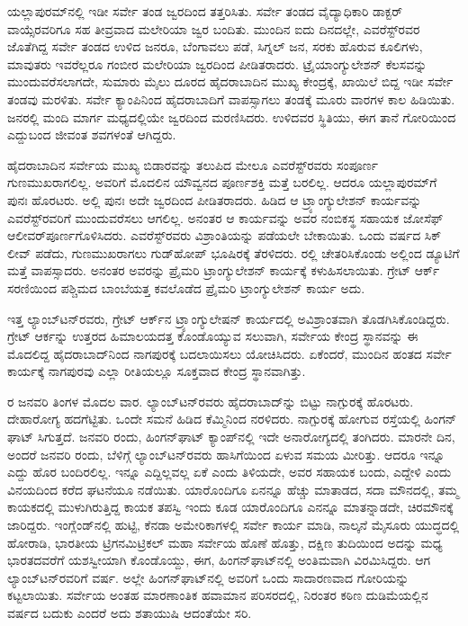 ಯಲ್ಲಾಪುರಮ್‌ನಲ್ಲಿ ಇಡೀ ಸರ್ವೇ ತಂಡ ಜ್ವರದಿಂದ ತತ್ತರಿಸಿತು. ಸರ್ವೇ ತಂಡದ ವೈದ್ಯಾಧಿಕಾರಿ ಡಾಕ್ಟರ್​ ವಾಯ್ಸೆರವರಿಗೂ ಸಹ ತೀವ್ರವಾದ ಮಲೇರಿಯಾ ಜ್ವರ ಬಂದಿತು. ಮುಂದಿನ ಐದು ದಿನದಲ್ಲೇ, ಎವರೆಸ್ಟ್​ರವರ ಜೊತೆಗಿದ್ದ ಸರ್ವೇ ತಂಡದ ಉಳಿದ  ಜನರೂ, ಬೆಂಗಾವಲು ಪಡೆ, ಸಿಗ್ನಲ್​ ಜನ, ಸರಕು ಹೊರುವ ಕೂಲಿಗಳು, ಮಾವುತರು ಇವರೆಲ್ಲರೂ ಗಂಬೀರ ಮಲೇರಿಯಾ ಜ್ವರದಿಂದ ಪೀಡಿತರಾದರು. ಟ್ರೈಯಾಂಗ್ಯುಲೇಶನ್​ ಕೆಲಸವನ್ನು ಮುಂದುವರೆಸಲಾಗದೇ, ಸುಮಾರು  ಮೈಲು ದೂರದ ಹೈದರಾಬಾದಿನ ಮುಖ್ಯ ಕೇಂದ್ರಕ್ಕೆ, ಖಾಯಿಲೆ ಬಿದ್ದ ಇಡೀ ಸರ್ವೇ ತಂಡವು ಮರಳಿತು. ಸರ್ವೇ ಕ್ಯಾಂಪಿನಿಂದ ಹೈದರಾಬಾದಿಗೆ ವಾಪಸ್ಸಾಗಲು ತಂಡಕ್ಕೆ ಮೂರು ವಾರಗಳ ಕಾಲ ಹಿಡಿಯಿತು.  ಜನರಲ್ಲಿ  ಮಂದಿ ಮಾರ್ಗ ಮಧ್ಯದಲ್ಲಿಯೇ ಜ್ವರದಿಂದ ಮರಣಿಸಿದರು. ಉಳಿದವರ ಸ್ಥಿತಿಯು, ಈಗ ತಾನೆ ಗೋರಿಯಿಂದ ಎದ್ದುಬಂದ ಜೀವಂತ ಶವಗಳಂತೆ ಆಗಿದ್ದರು.

ಹೈದರಾಬಾದಿನ ಸರ್ವೇಯ ಮುಖ್ಯ ಬಿಡಾರವನ್ನು ತಲುಪಿದ ಮೇಲೂ ಎವರೆಸ್ಟ್​ರವರು ಸಂಪೂರ್ಣ ಗುಣಮುಖರಾಗಲಿಲ್ಲ. ಅವರಿಗೆ ಮೊದಲಿನ ಯೌವ್ವನದ ಪೂರ್ಣಶಕ್ತಿ ಮತ್ತೆ ಬರಲಿಲ್ಲ. ಆದರೂ ಯಲ್ಲಾಪುರಮ್‌ಗೆ ಪುನಃ ಹೊರಟರು. ಅಲ್ಲಿ ಪುನಃ ಅದೇ ಜ್ವರದಿಂದ ಪೀಡಿತರಾದರು. ಹಿಡಿದ ಆ ಟ್ರ್ಯಾಂಗ್ಯುಲೇಶನ್​ ಕಾರ್ಯವನ್ನು ಎವರೆಸ್ಟ್​ರವರಿಗೆ ಮುಂದುವರೆಸಲು ಆಗಲಿಲ್ಲ. ಅನಂತರ ಆ ಕಾರ್ಯವನ್ನು ಅವರ ನಂಬಿಕಸ್ಥ ಸಹಾಯಕ ಜೋಸೆಫ್​ ಆಲೀವರ್​ ಪೂರ್ಣಗೊಳಿಸಿದರು. ಎವರೆಸ್ಟ್​ರವರು ವಿಶ್ರಾಂತಿಯನ್ನು ಪಡೆಯಲೇ ಬೇಕಾಯಿತು. ಒಂದು ವರ್ಷದ ಸಿಕ್​ ಲೀವ್​ ಪಡೆದು, ಗುಣಮುಖರಾಗಲು ಗುಡ್​ಹೋಪ್​ ಭೂಷಿರಕ್ಕೆ ತೆರಳಿದರು. ರಲ್ಲಿ ಚೇತರಿಸಿಕೊಂಡು ಅಲ್ಲಿಂದ ಡ್ಯೂಟಿಗೆ ಮತ್ತೆ ವಾಪಸ್ಸಾದರು. ಅನಂತರ ಅವರನ್ನು ಪ್ರೈಮರಿ ಟ್ರಾಂಗ್ಯುಲೇಶನ್​ ಕಾರ್ಯಕ್ಕೆ ಕಳುಹಿಸಲಾಯಿತು. ಗ್ರೇಟ್​ ಆರ್ಕ್ ಸರಣಿಯಿಂದ ಪಶ್ಚಿಮದ ಬಾಂಬೆಯತ್ತ ಕವಲೊಡೆದ ಪ್ರೈಮರಿ ಟ್ರಾಂಗ್ಯುಲೇಶನ್​ ಕಾರ್ಯ ಅದು.

ಇತ್ತ ಲ್ಯಾಂಬ್​ಟನ್​ರವರು, ಗ್ರೇಟ್​ ಆರ್ಕ್‌ನ ಟ್ರ್ಯಾಂಗ್ಯುಲೇಷನ್​ ಕಾರ್ಯದಲ್ಲಿ ಅವಿಶ್ರಾಂತವಾಗಿ ತೊಡಗಿಸಿಕೊಂಡಿದ್ದರು. ಗ್ರೇಟ್​ ಆರ್ಕನ್ನು ಉತ್ತರದ ಹಿಮಾಲಯದತ್ತ ಕೊಂಡೊಯ್ಯುವ ಸಲುವಾಗಿ, ಸರ್ವೇಯ ಕೇಂದ್ರ ಸ್ಥಾನವನ್ನು ಈ ಮೊದಲಿದ್ದ ಹೈದರಾಬಾದ್​ನಿಂದ ನಾಗಪುರಕ್ಕೆ ಬದಲಾಯಿಸಲು ಯೋಚಿಸಿದರು. ಏಕೆಂದರೆ, ಮುಂದಿನ ಹಂತದ ಸರ್ವೇ ಕಾರ್ಯಕ್ಕೆ ನಾಗಪುರವು ಎಲ್ಲಾ ರೀತಿಯಲ್ಲೂ ಸೂಕ್ತವಾದ ಕೇಂದ್ರ ಸ್ಥಾನವಾಗಿತ್ತು.

ರ ಜನವರಿ ತಿಂಗಳ ಮೊದಲ ವಾರ. ಲ್ಯಾಂಬ್​ಟನ್​ರವರು ಹೈದರಾಬಾದ್​ನ್ನು ಬಿಟ್ಟು ನಾಗ್ಪುರಕ್ಕೆ ಹೊರಟರು. ದೇಹಾರೋಗ್ಯ ಹದಗೆಟ್ಟಿತು. ಒಂದೇ ಸಮನೆ ಹಿಡಿದ ಕೆಮ್ಮಿನಿಂದ ನರಳಿದರು. ನಾಗ್ಪುರಕ್ಕೆ ಹೋಗುವ ರಸ್ತೆಯಲ್ಲಿ ಹಿಂಗನ್​ ಘಾಟ್​ ಸಿಗುತ್ತದೆ. ಜನವರಿ  ರಂದು, ಹಿಂಗನ್​ಘಾಟ್​ ಕ್ಯಾಂಪ್​ನಲ್ಲಿ ಇದೇ ಅನಾರೋಗ್ಯದಲ್ಲಿ ತಂಗಿದರು. ಮಾರನೇ ದಿನ, ಅಂದರೆ  ಜನವರಿ  ರಂದು, ಬೆಳಿಗ್ಗೆ ಲ್ಯಾಂಬ್​ಟನ್​ರವರು ಹಾಸಿಗೆಯಿಂದ ಏಳುವ ಸಮಯ ಮೀರಿತ್ತು. ಆದರೂ ಇನ್ನೂ ಎದ್ದು ಹೊರ ಬಂದಿರಲಿಲ್ಲ. ಇನ್ನೂ ಎದ್ದಿಲ್ಲವಲ್ಲ ಏಕೆ ಎಂದು ತಿಳಿಯದೇ, ಅವರ ಸಹಾಯಕ ಬಂದು, ಎದ್ದೇಳಿ ಎಂದು ವಿನಯದಿಂದ ಕರೆದ ಘಟನೆಯೂ ನಡೆಯಿತು. ಯಾರೊಂದಿಗೂ ಏನನ್ನೂ ಹೆಚ್ಚು ಮಾತಾಡದ, ಸದಾ ಮೌನದಲ್ಲಿ, ತಮ್ಮ ಕಾಯಕದಲ್ಲಿ ಮುಳುಗಿರುತ್ತಿದ್ದ ಕಾಯಕ ತಪಸ್ವಿ ಇಂದು ಕೂಡ ಯಾರೊಂದಿಗೂ ಎನನ್ನೂ ಮಾತನ್ನಾಡದೇ, ಚಿರಮೌನಕ್ಕೆ ಜಾರಿದ್ದರು. ಇಂಗ್ಲೆಂಡ್​ನಲ್ಲಿ ಹುಟ್ಟಿ, ಕೆನಡಾ ಅಮೇರಿಕಾಗಳಲ್ಲಿ ಸರ್ವೇ ಕಾರ್ಯ ಮಾಡಿ, ನಾಲ್ಕನೆ ಮೈಸೂರು ಯುದ್ಧದಲ್ಲಿ ಹೋರಾಡಿ, ಭಾರತೀಯ ಟ್ರಿಗನಮಿಟ್ರಿಕಲ್​ ಮಹಾ ಸರ್ವೇಯ ಹೊಣೆ ಹೊತ್ತು, ದಕ್ಷಿಣ ತುದಿಯಿಂದ ಅದನ್ನು ಮಧ್ಯ ಭಾರತದವರೆಗೆ ಯಶಸ್ವೀಯಾಗಿ ಕೊಂಡೊಯ್ದು, ಈಗ, ಹಿಂಗನ್​ಘಾಟ್​ನಲ್ಲಿ ಅಂತಿಮವಾಗಿ ವಿರಮಿಸಿದ್ದರು. ಆಗ ಲ್ಯಾಂಬ್​ಟನ್​ರವರಿಗೆ  ವರ್ಷ. ಅಲ್ಲೇ ಹಿಂಗನ್​ಘಾಟ್​ನಲ್ಲಿ ಅವರಿಗೆ ಒಂದು ಸಾದಾರಣವಾದ ಗೋರಿಯನ್ನು ಕಟ್ಟಲಾಯಿತು. ಸರ್ವೇಯ ಅಂತಹ ಮಾರಣಾಂತಿಕ ಹವಾಮಾನ ಪರಿಸರದಲ್ಲಿ, ನಿರಂತರ ಕಠಿಣ ದುಡಿಮೆಯಲ್ಲಿನ  ವರ್ಷದ ಬದುಕು ಎಂದರೆ ಅದು ಶತಾಯುಷಿ ಆದಂತೆಯೇ ಸರಿ.

